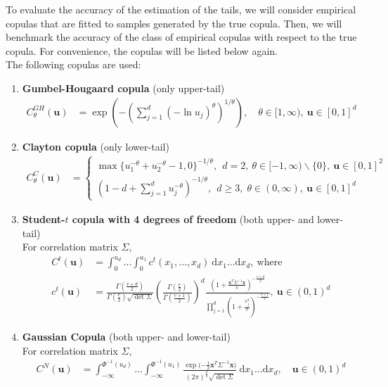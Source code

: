 \documentclass[12pt]{report}
\newcommand{\1}{\mathbf{1}}
\begin{document}
\begin{flushleft}
To evaluate the accuracy of the estimation of the tails, we will consider empirical copulas that are fitted to samples generated by the true copula. Then, we will benchmark the accuracy of the class of empirical copulas with respect to the true copula. For convenience, the copulas will be listed below again. \\
\vspace{0.5cm}
The following copulas are used:
\begin{enumerate}
\item \textbf{Gumbel-Hougaard copula} (only upper-tail) 
\begin{align*}
C^{GH}_{\theta}(\boldsymbol{u}) &= \exp \left( -\left( \sum\limits_{j = 1}^{d} (- \ln u_{j})^{\theta}\right)^{1/\theta} \right), \quad \theta \in [1,\infty), \: \boldsymbol{u} \in [0,1]^{d}
\end{align*}
\item \textbf{Clayton copula} (only lower-tail) 
\begin{align*}
C^{C}_{\theta}(\boldsymbol{u}) &= \left\{
\begin{array}{ll} 
\max \{ u_{1}^{-\theta} + u_{2}^{-\theta} - 1, 0 \}^{-1/\theta}, \: \: d = 2, \: \theta \in [-1,\infty) \backslash \{ 0 \}, \: \boldsymbol{u} \in [0,1]^{2} \\
(1 - d + \sum_{j = 1}^{d} u^{- \theta}_{j} )^{-1/\theta}, \: \: d \ge 3, \; \theta \in (0,\infty), \: \boldsymbol{u} \in [0,1]^{d}
\end{array} 
\right.
\end{align*}
\item \textbf{Student-$t$ copula with 4 degrees of freedom} (both upper- and lower-tail)\\
For correlation matrix $\Sigma$,
\begin{align*}
C^{t}(\boldsymbol{u}) &= \int_{0}^{u_{d}} \dots \int_{0}^{u_{1}} c^{t}(x_{1}, \dots, x_{d}) \: \mathrm{d}x_{1} \dots \mathrm{d}x_{d}, \: \mathrm{where} \\
 c^{t}(\boldsymbol{u}) &= \frac{\Gamma(\frac{v+d}{2})}{\Gamma(\frac{v}{2})\sqrt{\det \Sigma}} \left( \frac{\Gamma(\frac{v}{2})}{\Gamma(\frac{v+1}{2})} \right)^{d} \frac{ (1 + \frac{\boldsymbol{x}^{T}\Sigma^{-1}\boldsymbol{x}}{v})^{-\frac{v+d}{2}}}{\prod_{j = 1}^{d} (1 + \frac{x_{j}^{2}}{v})^{-\frac{v+1}{2}}} , \: \boldsymbol{u} \in (0,1)^{d}
\end{align*}
\newpage
\item \textbf{Gaussian Copula} (both upper- and lower-tail)\\
For correlation matrix $\Sigma$,
\begin{align*}
C^{N}(\boldsymbol{u}) &= \int_{-\infty}^{\Phi^{-1}(u_{d})} \dots \int_{-\infty}^{\Phi^{-1}(u_{1})} \frac{\exp{(-\frac{1}{2}\boldsymbol{x}^{T}\Sigma^{-1}\boldsymbol{x}})}{(2\pi)^{\frac{d}{2}}\sqrt{\det \Sigma}} \: \mathrm{d}x_{1} \dots \mathrm{d}x_{d}, \quad \boldsymbol{u} \in (0,1)^{d}
\end{align*}
\end{enumerate}


\end{flushleft}
\end{document}

